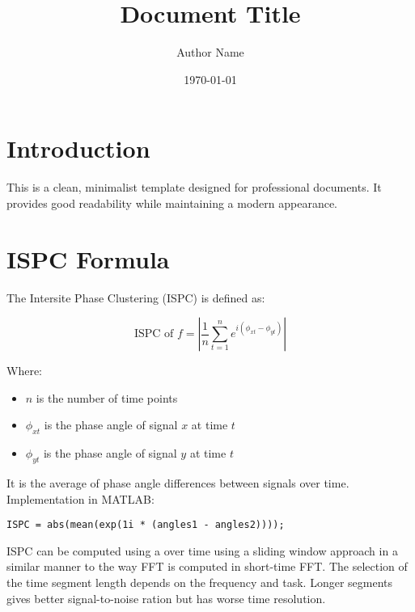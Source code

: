 \documentclass[11pt,a4paper]{article}
\title{\vspace{-2em}Document Title}
\author{Author Name}
\date{\today}
\begin{document}
\maketitle

\section{Introduction}
This is a clean, minimalist template designed for professional documents. It provides good readability while maintaining a modern appearance.

\section{ISPC Formula}
The Intersite Phase Clustering (ISPC) is defined as:

\begin{equation}
\text{ISPC of } f = \left| \frac{1}{n} \sum_{t=1}^{n} e^{i(\phi_{xt} - \phi_{yt})} \right|
\end{equation}

Where:
\begin{itemize}
    \item $n$ is the number of time points
    \item $\phi_{xt}$ is the phase angle of signal $x$ at time $t$
    \item $\phi_{yt}$ is the phase angle of signal $y$ at time $t$
\end{itemize}

It is the average of phase angle differences between signals over time. \\

Implementation in MATLAB:

\begin{verbatim}
ISPC = abs(mean(exp(1i * (angles1 - angles2))));
\end{verbatim}


ISPC can be computed using a over time using a sliding window approach in a similar manner to the way FFT is computed in short-time FFT. The selection of the time segment length depends on the frequency and task. Longer segments gives better signal-to-noise ration but has worse time resolution. \\
\end{document}
